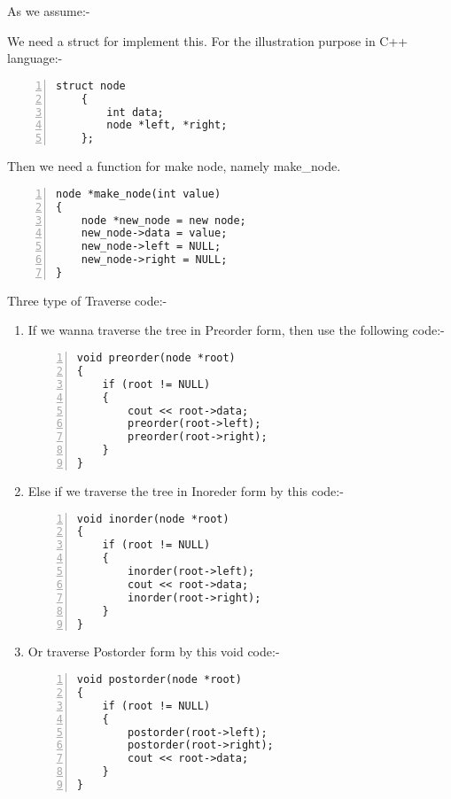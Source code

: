 \documentclass[10 pt]{article}
\begin{document}
As we assume:-
\begin{center}
\end{center}

We need a struct for implement this. For the illustration purpose in C++ language:-\hfill
\begin{lstlisting}[caption = struct for node, numbers = left]
	struct node
	{
		int data;
		node *left, *right;
	};
\end{lstlisting}

Then we need a function for make node, namely make\_node.\hfill
\begin{lstlisting}[caption = Function for make a new node, numbers = left]
node *make_node(int value)
{
    node *new_node = new node;
    new_node->data = value;
    new_node->left = NULL;
    new_node->right = NULL;
}
\end{lstlisting}

Three type of Traverse code:-\hfill
\begin{enumerate}

	\item If we wanna traverse the tree in Preorder form, then use the following code:-\hfill
	\begin{lstlisting}[caption = Void function for preorder traverse, numbers = left]
void preorder(node *root)
{
    if (root != NULL)
    {
        cout << root->data;
        preorder(root->left);
        preorder(root->right);
    }
}
	\end{lstlisting}
	
	\item Else if we traverse the tree in Inoreder form by this code:-\hfill
	\begin{lstlisting}[caption = Void function for preorder traverse, numbers = left]
void inorder(node *root)
{
    if (root != NULL)
    {
        inorder(root->left);
        cout << root->data;
        inorder(root->right);
    }
}
	\end{lstlisting}
	
	\item Or traverse Postorder form by this void code:-\hfill
	\begin{lstlisting}[caption = Void function for preorder traverse, numbers = left]
void postorder(node *root)
{
    if (root != NULL)
    {
        postorder(root->left);
        postorder(root->right);
        cout << root->data;
    }
}
		\end{lstlisting}
	
\end{enumerate}
\end{document}
